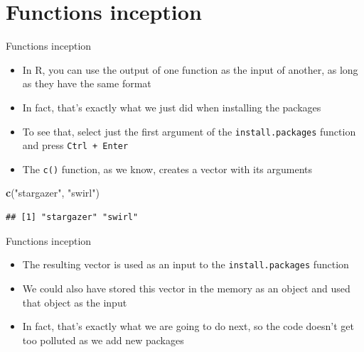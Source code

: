 \documentclass[ignorenonframetext,]{beamer}
\newenvironment{Shaded}{\begin{snugshade}}{\end{snugshade}}
\newcommand{\KeywordTok}[1]{\textcolor[rgb]{0.13,0.29,0.53}{\textbf{#1}}}
\newcommand{\StringTok}[1]{\textcolor[rgb]{0.31,0.60,0.02}{#1}}
\newcommand{\NormalTok}[1]{#1}
\providecommand{\tightlist}{%
  \setlength{\itemsep}{0pt}\setlength{\parskip}{0pt}}
\begin{document}
\section{Functions inception}\label{functions-inception}

\begin{frame}[fragile]{Functions inception}

\begin{itemize}
\tightlist
\item
  In R, you can use the output of one function as the input of another,
  as long as they have the same format
\item
  In fact, that's exactly what we just did when installing the packages
\item
  To see that, select just the first argument of the
  \texttt{install.packages} function and press \texttt{Ctrl\ +\ Enter}
\item
  The \texttt{c()} function, as we know, creates a vector with its
  arguments
\end{itemize}

\begin{Shaded}
\begin{Highlighting}[]
  \KeywordTok{c}\NormalTok{(}\StringTok{"stargazer"}\NormalTok{, }\StringTok{"swirl"}\NormalTok{)}
\end{Highlighting}
\end{Shaded}

\begin{verbatim}
## [1] "stargazer" "swirl"
\end{verbatim}

\end{frame}

\begin{frame}[fragile]{Functions inception}

\begin{itemize}
\tightlist
\item
  The resulting vector is used as an input to the
  \texttt{install.packages} function
\item
  We could also have stored this vector in the memory as an object and
  used that object as the input
\item
  In fact, that's exactly what we are going to do next, so the code
  doesn't get too polluted as we add new packages
\end{itemize}

\end{frame}
\end{document}
